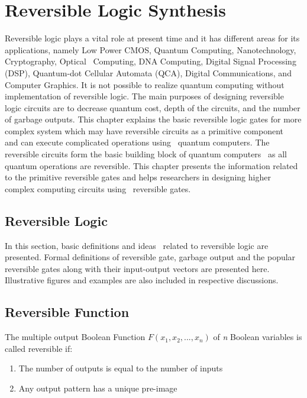 \chapter{Reversible Logic Synthesis}
\label{ch:part1_chapter1}


Reversible logic plays a vital role at present time and it has different areas for its applications, namely Low Power CMOS, Quantum Computing, Nanotechnology, Cryptography,
Optical~ Computing, DNA Computing, Digital Signal Processing (DSP), Quantum-dot Cellular Automata (QCA), Digital Communications, and Computer Graphics. It is not possible to realize quantum computing without implementation of reversible logic. The main purposes of designing reversible logic circuits are to decrease quantum cost, depth of the circuits, and the number of garbage outputs.%
This chapter explains the basic reversible logic gates for more complex system which may have reversible circuits as a primitive component~ and can execute complicated operations using~ quantum computers. The reversible circuits form the basic building block of quantum computers~ as all quantum operations are reversible. This chapter presents the information related to the primitive reversible gates and helps researchers in designing higher complex computing circuits using~ reversible gates.


\section{Reversible Logic}
In this section, basic definitions and ideas~ related to reversible logic are presented. Formal definitions of reversible gate, garbage output and the popular reversible gates along with their input-output vectors are presented here.
Illustrative figures and examples are also included in respective discussions.

\section{Reversible Function}
The multiple output Boolean Function $F(x_1, x_2, ...,x_n)$ of \textit{n} Boolean variables is called reversible if:
\begin{enumerate}
\item The number of outputs is equal to the number of inputs
\item Any output pattern has a unique pre-image
\end{enumerate}


